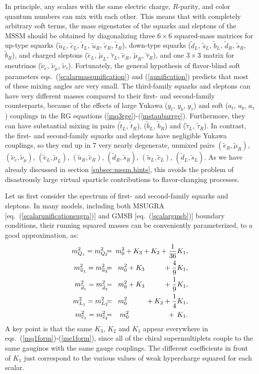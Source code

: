 \documentclass[11pt]{article}
\def\beq{\begin{eqnarray}}
\def\eeq{\end{eqnarray}}
\def\sbar{\overline}
\def\stilde{\widetilde}
\begin{document}
In principle, any scalars with the same electric charge, $R$-parity, and 
color quantum numbers can mix with each other. This means that with 
completely arbitrary soft terms, the mass eigenstates of the squarks and 
sleptons of the MSSM should be obtained by diagonalizing three $6\times 6$ 
squared-mass matrices for up-type squarks ($\stilde u_L$, $\stilde c_L$, 
$\stilde t_L$, $\stilde u_R$, $\stilde c_R$, $\stilde t_R$), down-type 
squarks ($\stilde d_L$, $\stilde s_L$, $\stilde b_L$, $\stilde d_R$, 
$\stilde s_R$, $\stilde b_R$), and charged sleptons ($\stilde e_L$, 
$\stilde \mu_L$, $\stilde \tau_L$, $\stilde e_R$, $\stilde \mu_R$, 
$\stilde \tau_R$), and one $3\times 3$ matrix for sneutrinos ($\stilde 
\nu_e$, $\stilde \nu_\mu$, $\stilde \nu_\tau$). Fortunately, the general 
hypothesis of flavor-blind soft parameters 
eqs.~(\ref{scalarmassunification}) and (\ref{aunification}) predicts that 
most of these mixing angles are very small. The third-family squarks and 
sleptons can have very different masses compared to their first- and 
second-family counterparts, because of the effects of large Yukawa ($y_t$, 
$y_b$, $y_\tau$) and soft ($a_t$, $a_b$, $a_\tau$) couplings in the RG 
equations (\ref{mq3rge})-(\ref{mstaubarrge}). Furthermore, they can have 
substantial mixing in pairs ($\stilde t_L$, $\stilde t_R$), ($\stilde 
b_L$, $\stilde b_R$) and ($\stilde \tau_L$, $\stilde \tau_R$). In 
contrast, the first- and second-family squarks and sleptons have 
negligible Yukawa couplings, so they end up in 7 very nearly degenerate, 
unmixed pairs $(\stilde e_R, \stilde \mu_R)$, $(\stilde \nu_e, \stilde 
\nu_\mu)$, $(\stilde e_L, \stilde \mu_L)$, $(\stilde u_R, \stilde c_R)$, 
$(\stilde d_R, \stilde s_R)$, $(\stilde u_L, \stilde c_L)$, $(\stilde d_L, 
\stilde s_L)$. As we have already discussed in section 
\ref{subsec:mssm.hints}, this avoids the problem of disastrously large 
virtual sparticle contributions to flavor-changing processes.

Let us first consider the spectrum of first- and second-family squarks and 
sleptons. In many models, including both MSUGRA 
[eq.~(\ref{scalarunificationsugra})] and GMSB 
[eq.~(\ref{scalargmsb})] boundary conditions, their running squared masses 
can be conveniently parameterized, to a good approximation, as:
\beq
m_{Q_1}^2 = m_{Q_2}^2  \!\!\!&=&\!\!\! m_0^2 + K_3 + K_2 + {1\over 36}K_1,
\label{mq1form} \\
m_{\sbar u_1}^2 = m_{\sbar u_2}^2 \!\!\! &=&\!\!\! m_0^2 + K_3
\qquad\>\>\>
+ {4\over 9} K_1,
\\
m_{\sbar d_1}^2 = m_{\sbar d_2}^2  \!\!\!&=&\!\!\! m_0^2 + K_3
\qquad\>\>\>
+ {1\over 9} K_1,
\\
m_{L_1}^2 = m_{L_2}^2 \!\!\!&=&\!\!\! m_0^2 \qquad\>\>\> + K_2 + {1\over
4} K_1,
\\
m_{\sbar e_1}^2 = m_{\sbar e_2}^2 \!\!\!&=&\!\!\! m_0^2
\qquad\qquad\>\>\>\>\>\> \, +\, K_1.
\label{me1form}
\eeq
A key point is that the same $K_3$, $K_2$ and $K_1$ appear everywhere in 
eqs.~(\ref{mq1form})-(\ref{me1form}), since all of the chiral 
supermultiplets couple to the same gauginos with the same gauge couplings. 
The different coefficients in front of $K_1$ just correspond to the 
various values of weak hypercharge squared for each scalar.
\end{document}

